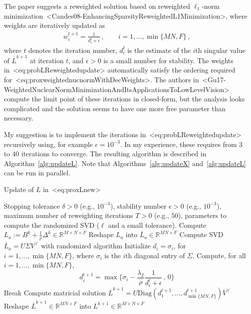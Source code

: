 \documentclass[a4paper,11pt]{article}
\def\cite#1{<#1>}%
\def\eqref#1{<#1>}%
\begin{document}
The paper suggests a reweighted solution based on reweighted $\ell_1$-norm
minimization~\cite{Candes08-EnhancingSparsityReweightedL1Minimization}, where
weights are iteratively updated as
\begin{align}
	\label{eq:probLReweightedupdate}
	w_i^{t+1} = \frac{1}{d_i^t + \epsilon}\,,\qquad
	i = 1, \ldots, \min\{MN, F\}\,,
\end{align}
where $t$ denotes the iteration number, $d_i^t$ is the estimate of
the $i$th singular value of $\overline{L}^{k+1}$ at iteration $t$, and $\epsilon > 0$ is a small number for
stability.
The weights in~\eqref{eq:probLReweightedupdate} automatically satisfy the
ordering required for~\eqref{eq:proxweightednucnormWithDecWeights}.
The authors
in~\cite{Gu17-WeightedNuclearNormMinimizationAndItsApplicationsToLowLevelVision}
compute the limit point of these iterations in closed-form, but the analysis
looks complicated and the solution seems to have one more free parameter than
necessary.

My suggestion is to implement the iterations
in~\eqref{eq:probLReweightedupdate} recursively using, for example $\epsilon =
	10^{-3}$. In my experience, these requires from $3$ to $40$ iterations to
converge. The resulting algorithm is described in Algorithm~\ref{alg:updateL}.
Note that Algorithms~\ref{alg:updateX} and~\ref{alg:updateL} can be run in
parallel.

\begin{algorithm}
	\caption{Update of $L$ in~\eqref{eq:proxLnew}}
	\label{alg:updateL}
	\begin{algorithmic}[1]
		\algrenewcommand{}
		\Require Stopping tolerance $\delta > 0$ (e.g., $10^{-3}$), stability number $\epsilon > 0$ (e.g., $10^{-3}$), maximum number of
		reweighting iterations $T > 0$ (e.g., $50$), parameters to compute the
		randomized SVD ($\ell$ and a small tolerance).
		\State Compute $L_a := B^k + \frac{1}{\rho}\Delta^k \in \mathbb{R}^{M\times N\times F}$
		\State Reshape $L_a$ into $\overline{L}_a \in \mathbb{R}^{MN \times F}$
		\State Compute SVD $\overline{L}_a = U \Sigma V^\top$ with randomized
		algorithm
		\State Initialize $d_i = \sigma_i$, for $i = 1, \ldots, \min\{MN, F\}$, where
		$\sigma_i$ is the $i$th diagonal entry of $\Sigma$.
		\State Compute, for all $i = 1, \ldots, \min\{MN, F\}$,
		$$
			d_i^{t+1} = \max\Big\{\sigma_i - \frac{\lambda_2}{\rho}\frac{1}{d_i^t + \epsilon}\, ,\, 0\Big\}
		$$
		\State Break
		\EndIf
		\EndFor
		\State Compute matricial solution $\overline{L}^{k+1} = U
			\text{Diag}(d_1^{t+1}, \ldots, d_{\min\{MN, F\}}^{t+1}) V^\top$
		\State Reshape $\overline{L}^{k+1} \in \mathbb{R}^{MN \times F}$ into
		$L^{k+1} \in \mathbb{R}^{M\times N\times F}$
	\end{algorithmic}
\end{algorithm}
\end{document}

